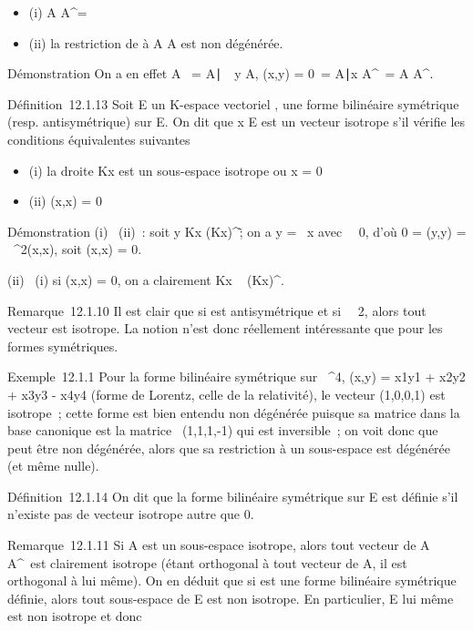 \begin{itemize}
\itemsep1pt\parskip0pt
\item
  (i) A \bigcap A^\bot = \0\
\item
  (ii) la restriction de \phi à A \times A est non dégénérée.
\end{itemize}

Démonstration On a en effet
\mathrmKer\phi\textbar{}A\timesA~
= \x \in
A∣\forall~~y \in A, \phi(x,y) =
0\ = \x \in
A∣x \in A^\bot\ = A \bigcap
A^\bot.

Définition~12.1.13 Soit E un K-espace vectoriel , \phi une forme bilinéaire
symétrique (resp. antisymétrique) sur E. On dit que x \in E est un vecteur
isotrope s'il vérifie les conditions équivalentes suivantes

\begin{itemize}
\itemsep1pt\parskip0pt
\item
  (i) la droite Kx est un sous-espace isotrope ou x = 0
\item
  (ii) \phi(x,x) = 0
\end{itemize}

Démonstration (i) \rigtharrow~(ii)~: soit y \in Kx \bigcap
(Kx)^\bot\diagdown\0\~; on a y = \lambda~x
avec \lambda~\neq~0, d'où 0 = \phi(y,y) =
\lambda~^2\phi(x,x), soit \phi(x,x) = 0.

(ii) \rigtharrow~(i) si \phi(x,x) = 0, on a clairement Kx \subset~ (Kx)^\bot.

Remarque~12.1.10 Il est clair que si \phi est antisymétrique et si
\mathrmcarK\mathrel\neq~~2,
alors tout vecteur est isotrope. La notion n'est donc réellement
intéressante que pour les formes symétriques.

Exemple~12.1.1 Pour la forme bilinéaire symétrique sur ~^4,
\phi(x,y) = x1y1 + x2y2 +
x3y3 - x4y4 (forme de Lorentz,
celle de la relativité), le vecteur (1,0,0,1) est isotrope~; cette forme
est bien entendu non dégénérée puisque sa matrice dans la base canonique
est la matrice
\mathrmdiag~(1,1,1,-1) qui
est inversible~; on voit donc que \phi peut être non dégénérée, alors que
sa restriction à un sous-espace est dégénérée (et même nulle).

Définition~12.1.14 On dit que la forme bilinéaire symétrique \phi sur E est
définie s'il n'existe pas de vecteur isotrope autre que 0.

Remarque~12.1.11 Si A est un sous-espace isotrope, alors tout vecteur de
A \bigcap A^\bot\diagdown\0\ est clairement
isotrope (étant orthogonal à tout vecteur de A, il est orthogonal à lui
même). On en déduit que si \phi est une forme bilinéaire symétrique
définie, alors tout sous-espace de E est non isotrope. En particulier, E
lui même est non isotrope et donc


